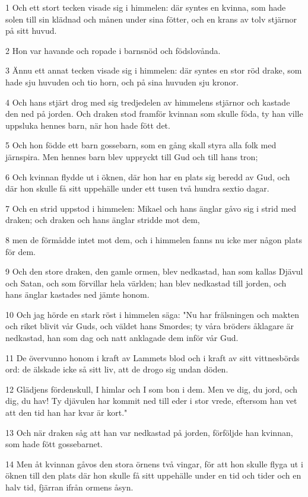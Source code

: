 \par 1 Och ett stort tecken visade sig i himmelen: där syntes en kvinna, som hade solen till sin klädnad och månen under sina fötter, och en krans av tolv stjärnor på sitt huvud.
\par 2 Hon var havande och ropade i barnsnöd och födslovånda.
\par 3 Ännu ett annat tecken visade sig i himmelen: där syntes en stor röd drake, som hade sju huvuden och tio horn, och på sina huvuden sju kronor.
\par 4 Och hans stjärt drog med sig tredjedelen av himmelens stjärnor och kastade den ned på jorden. Och draken stod framför kvinnan som skulle föda, ty han ville uppsluka hennes barn, när hon hade fött det.
\par 5 Och hon födde ett barn gossebarn, som en gång skall styra alla folk med järnspira. Men hennes barn blev uppryckt till Gud och till hans tron;
\par 6 Och kvinnan flydde ut i öknen, där hon har en plats sig beredd av Gud, och där hon skulle få sitt uppehälle under ett tusen två hundra sextio dagar.
\par 7 Och en strid uppstod i himmelen: Mikael och hans änglar gåvo sig i strid med draken; och draken och hans änglar stridde mot dem,
\par 8 men de förmådde intet mot dem, och i himmelen fanns nu icke mer någon plats för dem.
\par 9 Och den store draken, den gamle ormen, blev nedkastad, han som kallas Djävul och Satan, och som förvillar hela världen; han blev nedkastad till jorden, och hans änglar kastades ned jämte honom.
\par 10 Och jag hörde en stark röst i himmelen säga: "Nu har frälsningen och makten och riket blivit vår Guds, och väldet hans Smordes; ty våra bröders åklagare är nedkastad, han som dag och natt anklagade dem inför vår Gud.
\par 11 De övervunno honom i kraft av Lammets blod och i kraft av sitt vittnesbörds ord: de älskade icke så sitt liv, att de drogo sig undan döden.
\par 12 Glädjens fördenskull, I himlar och I som bon i dem. Men ve dig, du jord, och dig, du hav! Ty djävulen har kommit ned till eder i stor vrede, eftersom han vet att den tid han har kvar är kort."
\par 13 Och när draken såg att han var nedkastad på jorden, förföljde han kvinnan, som hade fött gossebarnet.
\par 14 Men åt kvinnan gåvos den stora örnens två vingar, för att hon skulle flyga ut i öknen till den plats där hon skulle få sitt uppehälle under en tid och tider och en halv tid, fjärran ifrån ormens åsyn.

